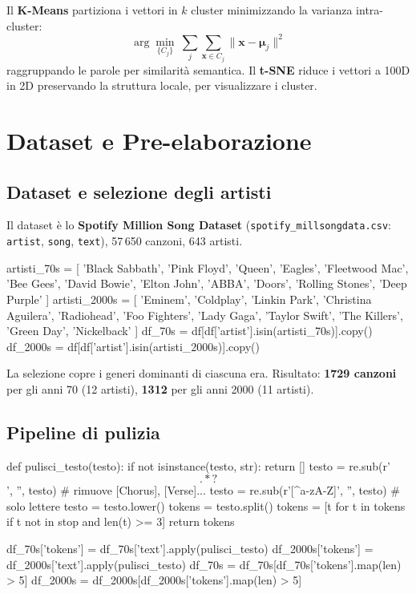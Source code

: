 \documentclass[12pt,a4paper]{article}
\begin{document}
Il \textbf{K-Means} partiziona i vettori in $k$ cluster minimizzando la varianza intra-cluster:
\[
  \arg\min_{\{C_j\}}\ \sum_j \sum_{\mathbf{x}\in C_j}\|\mathbf{x}-\boldsymbol{\mu}_j\|^2
\]
raggruppando le parole per similarit\`a semantica. Il \textbf{t-SNE} riduce i vettori a 100D in 2D preservando la struttura locale, per visualizzare i cluster.

\section{Dataset e Pre-elaborazione}

\subsection{Dataset e selezione degli artisti}

Il dataset \`e lo \textbf{Spotify Million Song Dataset} (\texttt{spotify\_millsongdata.csv}: \texttt{artist}, \texttt{song}, \texttt{text}), 57\,650 canzoni, 643 artisti.

\begin{pylisting}[title={Selezione artisti per era}]
artisti_70s = [
    'Black Sabbath', 'Pink Floyd', 'Queen',
    'Eagles', 'Fleetwood Mac', 'Bee Gees',
    'David Bowie', 'Elton John', 'ABBA',
    'Doors', 'Rolling Stones', 'Deep Purple'
]
artisti_2000s = [
    'Eminem', 'Coldplay', 'Linkin Park',
    'Christina Aguilera', 'Radiohead', 'Foo Fighters',
    'Lady Gaga', 'Taylor Swift', 'The Killers',
    'Green Day', 'Nickelback'
]
df_70s   = df[df['artist'].isin(artisti_70s)].copy()
df_2000s = df[df['artist'].isin(artisti_2000s)].copy()
\end{pylisting}

La selezione copre i generi dominanti di ciascuna era. Risultato: \textbf{1729 canzoni} per gli anni 70 (12 artisti), \textbf{1312} per gli anni 2000 (11 artisti).

\subsection{Pipeline di pulizia}

\begin{pylisting}[title={Pulizia e tokenizzazione dei testi}]
def pulisci_testo(testo):
    if not isinstance(testo, str):
        return []
    testo = re.sub(r'\[.*?\]', '', testo)       # rimuove [Chorus], [Verse]...
    testo = re.sub(r'[^a-zA-Z\s]', '', testo)   # solo lettere
    testo = testo.lower()
    tokens = testo.split()
    tokens = [t for t in tokens if t not in stop and len(t) >= 3]
    return tokens

df_70s['tokens']   = df_70s['text'].apply(pulisci_testo)
df_2000s['tokens'] = df_2000s['text'].apply(pulisci_testo)
df_70s   = df_70s[df_70s['tokens'].map(len) > 5]
df_2000s = df_2000s[df_2000s['tokens'].map(len) > 5]
\end{pylisting}
\end{document}
